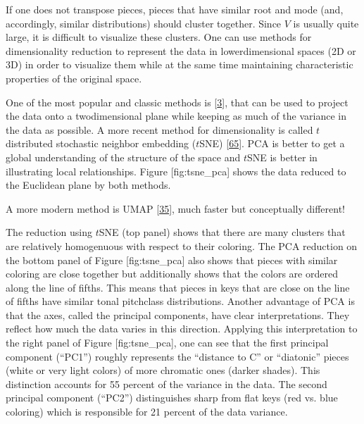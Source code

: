 \documentclass[letterpaper,10pt,english]{sphinxmanual}
\begin{document}
\sphinxAtStartPar
If one does not transpose pieces, pieces that have similar root and mode
(and, accordingly, similar distributions) should cluster together. Since
\(V\) is usually quite large, it is difficult to visualize these
clusters. One can use methods for dimensionality reduction to represent
the data in lower\sphinxhyphen{}dimensional spaces (2D or 3D) in order to visualize
them while at the same time maintaining characteristic properties of the
original space.

\sphinxAtStartPar
One of the most popular and classic methods is  {[}\hyperlink{cite.8_bibliography:id72}{3}{]}, that can be used to project
the data onto a two\sphinxhyphen{}dimensional plane while keeping as much of the
variance in the data as possible. A more recent method for
dimensionality is called \(t\)\sphinxhyphen{}distributed stochastic neighbor
embedding (\(t\)\sphinxhyphen{}SNE) {[}\hyperlink{cite.8_bibliography:id74}{65}{]}. PCA is
better to get a global understanding of the structure of the space and
\(t\)\sphinxhyphen{}SNE is better in illustrating local relationships. Figure
{[}fig:tsne\_pca{]} shows the data reduced to the Euclidean plane by both
methods.

\sphinxAtStartPar
A more modern method is UMAP {[}\hyperlink{cite.8_bibliography:id73}{35}{]}, much faster but conceptually different!

\sphinxAtStartPar
The reduction using \(t\)\sphinxhyphen{}SNE (top panel) shows that there are many
clusters that are relatively homogenuous with respect to their coloring.
The PCA reduction on the bottom panel of Figure {[}fig:tsne\_pca{]} also
shows that pieces with similar coloring are close together but
additionally shows that the colors are ordered along the line of fifths.
This means that pieces in keys that are close on the line of fifths have
similar tonal pitch\sphinxhyphen{}class distributions. Another advantage of PCA is
that the axes, called the principal components, have clear
interpretations. They reflect how much the data varies in this
direction. Applying this interpretation to the right panel of Figure
{[}fig:tsne\_pca{]}, one can see that the first principal component (“PC1”)
roughly represents the “distance to C” or “diatonic” pieces (white or
very light colors) of more chromatic ones (darker shades). This
distinction accounts for 55 percent of the variance in the data. The
second principal component (“PC2”) distinguishes sharp from flat keys
(red vs. blue coloring) which is responsible for 21 percent of the data
variance.
\end{document}
